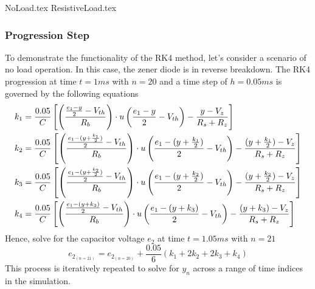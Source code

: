 {NoLoad.tex}
{ResistiveLoad.tex}

\subsubsection{Progression Step}
To demonstrate the functionality of the RK4 method, let's consider a scenario of no load operation. In this case, the zener diode is in reverse breakdown. The RK4 progression at time $t=1ms$ with $n=20$ and a time step of $h=0.05ms$ is governed by the following equations
\begin{equation}
	\begin{split}
		k_1 &= \frac{0.05}{C}\left[\left(\frac{\frac{e_1 - y}{2} - V_{th}}{R_b} \right)\cdot u\left(\frac{e_1 - y}{2} - V_{th} \right)-\frac{y-V_z}{R_s+R_z} \right] \\
	k_2 &= \frac{0.05}{C}\left[\left(\frac{\frac{e_1 - (y+\frac{k_1}{2})}{2} - V_{th}}{R_b} \right)\cdot u\left(\frac{e_1 - (y+\frac{k_1}{2})}{2} - V_{th} \right)-\frac{(y+\frac{k_1}{2})-V_z}{R_s+R_z} \right] \\
	k_3 &= \frac{0.05}{C}\left[\left(\frac{\frac{e_1 - (y+\frac{k_2}{2})}{2} - V_{th}}{R_b} \right)\cdot u\left(\frac{e_1 - (y+\frac{k_2}{2})}{2} - V_{th} \right)-\frac{(y+\frac{k_2}{2})-V_z}{R_s+R_z} \right] \\
	k_4 &= \frac{0.05}{C}\left[\left(\frac{\frac{e_1 - (y+k_3)}{2} - V_{th}}{R_b} \right)\cdot u\left(\frac{e_1 - (y+k_3)}{2} - V_{th} \right)-\frac{(y+k_3)-V_z}{R_s+R_z} \right]
	\end{split}
\end{equation}
Hence, solve for the capacitor voltage $e_2$ at time $t=1.05ms$ with $n=21$
\begin{equation}
	e_{2_(n=21)} = e_{2_(n=20)} + \frac{0.05}{6}(k_1+2k_2+2k_3+k_4)
\end{equation}
This process is iteratively repeated to solve for $y_n$ across a range of time indices in the simulation.

